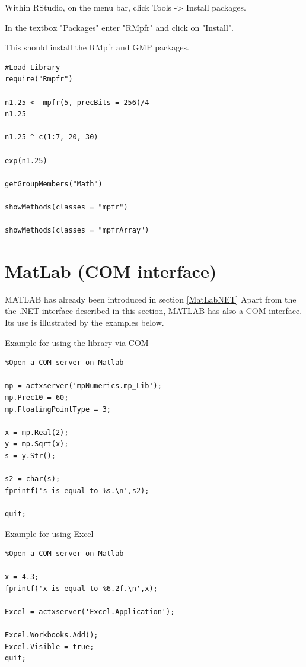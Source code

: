 Within RStudio, on the menu bar, click Tools -> Install packages.

In the textbox "Packages" enter "RMpfr" and click on "Install".

This should install the RMpfr and GMP packages.

\begin{lstlisting}
#Load Library
require("Rmpfr")

n1.25 <- mpfr(5, precBits = 256)/4
n1.25

n1.25 ^ c(1:7, 20, 30)

exp(n1.25)

getGroupMembers("Math")

showMethods(classes = "mpfr")

showMethods(classes = "mpfrArray")

\end{lstlisting}




\newpage
\section{MatLab (COM interface)}
\label{MatLabCOM}

MATLAB has already been introduced in section \ref{MatLabNET} Apart from the the .NET interface described in this section, MATLAB has also a COM interface. Its use is illustrated by the examples below.

\vpara
Example for using the library via COM

\begin{lstlisting}
%Open a COM server on Matlab

mp = actxserver('mpNumerics.mp_Lib');
mp.Prec10 = 60;
mp.FloatingPointType = 3;

x = mp.Real(2);
y = mp.Sqrt(x);
s = y.Str();

s2 = char(s);
fprintf('s is equal to %s.\n',s2);

quit;

\end{lstlisting}


\vpara
Example for using Excel

\begin{lstlisting}
%Open a COM server on Matlab

x = 4.3;
fprintf('x is equal to %6.2f.\n',x);

Excel = actxserver('Excel.Application');

Excel.Workbooks.Add();
Excel.Visible = true;
quit;
\end{lstlisting}








